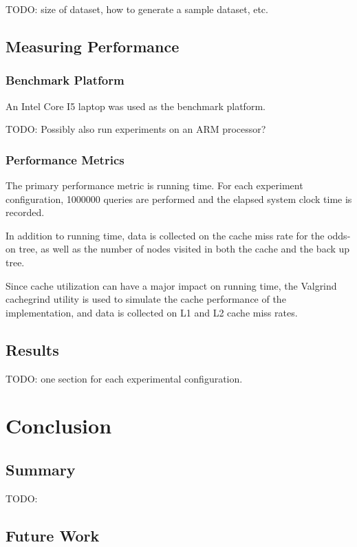 \documentclass[mcs]{scsthesis}
\begin{document}
TODO: size of dataset, how to generate a sample dataset, etc.


\section{Measuring Performance}

\subsection{Benchmark Platform}

An Intel Core I5 laptop was used as the benchmark platform.

TODO: Possibly also run experiments on an ARM processor?

\subsection{Performance Metrics}

The primary performance metric is running time.  For each experiment
configuration, 1000000 queries are performed and the elapsed system clock
time is recorded.

In addition to running time, data is collected on the cache miss rate for the
odds-on tree, as well as the number of nodes visited in both the cache and the
back up tree.

Since cache utilization can have a major impact on running time, the Valgrind
\cite{valgrind} cachegrind utility is used to simulate the cache performance
of the implementation, and data is collected on L1 and L2 cache miss rates.

\section{Results}

TODO: one section for each experimental configuration.

\chapter{Conclusion}

\section{Summary}

TODO:

\section{Future Work}
\end{document}
